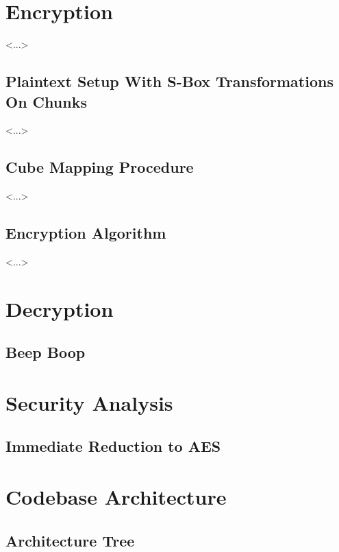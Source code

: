 \documentclass[12pt]{article}
\begin{document}
\section{Encryption}
<...>

\subsection{Plaintext Setup With S-Box Transformations On Chunks}
<...>

\subsection{Cube Mapping Procedure}
<...>

\subsection{Encryption Algorithm}
<...>

\section{Decryption}

\subsection{Beep Boop}

\section{Security Analysis}

\subsection{Immediate Reduction to AES}

\section{Codebase Architecture}

\subsection{Architecture Tree}
\end{document}
